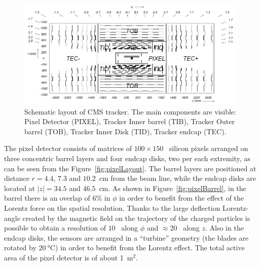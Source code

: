 \begin{figure}[hbt]
  \begin{center}
    \includegraphics[width=0.98\textwidth]{figDetector/stripLayout.png}
    \caption{Schematic layout of CMS tracker. The main components are visible:
             Pixel Detector (PIXEL), Tracker Inner barrel (TIB), Tracker Outer barrel
             (TOB), Tracker Inner Disk (TID), Tracker endcap (TEC).~\cite{Chatrchyan:2008aa}} 
    \label{fig:trackerLayout}
  \end{center}
\end{figure}

The pixel detector consists of matrices of $100\times150$~\si{\mum} silicon pixels
arranged on three concentric barrel layers and four endcap disks, two per
each extremity, as can be seen from the Figure~\ref{fig:pixelLayout}. 
The barrel layers are positioned at distance $r=4.4$, $7.3$ and $10.2$~\si{cm} 
from the beam line, while the endcap disks are located at $|z|=34.5$ and $46.5$~\si{cm}.
As shown in Figure~\ref{fig:pixelBarrel}, in the barrel there is an overlap of 6\%
in $\phi$ in order to benefit from the effect of the Lorentz force on the spatial resolution.
Thanks to the large deflection Lorentz-angle created by the magnetic field
on the trajectory of the charged particles is possible to obtain a resolution of $10$~\si{\mum} 
along $\phi$ and $\approx 20$~\si{\mum} along $z$. Also in the endcap disks, the sensors 
are arranged in a ``turbine'' geometry (the blades are rotated by $20~\si{\degreeCelsius}$) 
in order to benefit from the Lorentz effect. The total active area of the pixel detector is of about 1~\si{m}$^2$.

